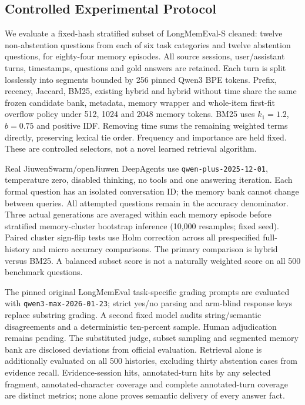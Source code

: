 \subsection{Controlled Experimental Protocol}
We evaluate a fixed-hash stratified subset of LongMemEval-S cleaned: twelve non-abstention questions from each of six task categories and twelve abstention questions, for eighty-four memory episodes. All source sessions, user/assistant turns, timestamps, questions and gold answers are retained. Each turn is split losslessly into segments bounded by 256 pinned Qwen3 BPE tokens. Prefix, recency, Jaccard, BM25, existing hybrid and hybrid without time share the same frozen candidate bank, metadata, memory wrapper and whole-item first-fit overflow policy under 512, 1024 and 2048 memory tokens. BM25 uses $k_1=1.2$, $b=0.75$ and positive IDF. Removing time sums the remaining weighted terms directly, preserving lexical tie order. Frequency and importance are held fixed. These are controlled selectors, not a novel learned retrieval algorithm.

Real JiuwenSwarm/openJiuwen DeepAgents use \texttt{qwen-plus-2025-12-01}, temperature zero, disabled thinking, no tools and one answering iteration. Each formal question has an isolated conversation ID; the memory bank cannot change between queries. All attempted questions remain in the accuracy denominator. Three actual generations are averaged within each memory episode before stratified memory-cluster bootstrap inference (10,000 resamples; fixed seed). Paired cluster sign-flip tests use Holm correction across all prespecified full-history and micro accuracy comparisons. The primary comparison is hybrid versus BM25. A balanced subset score is not a naturally weighted score on all 500 benchmark questions.

The pinned original LongMemEval task-specific grading prompts are evaluated with \texttt{qwen3-max-2026-01-23}; strict yes/no parsing and arm-blind response keys replace substring grading. A second fixed model audits string/semantic disagreements and a deterministic ten-percent sample. Human adjudication remains pending. The substituted judge, subset sampling and segmented memory bank are disclosed deviations from official evaluation. Retrieval alone is additionally evaluated on all 500 histories, excluding thirty abstention cases from evidence recall. Evidence-session hits, annotated-turn hits by any selected fragment, annotated-character coverage and complete annotated-turn coverage are distinct metrics; none alone proves semantic delivery of every answer fact.

